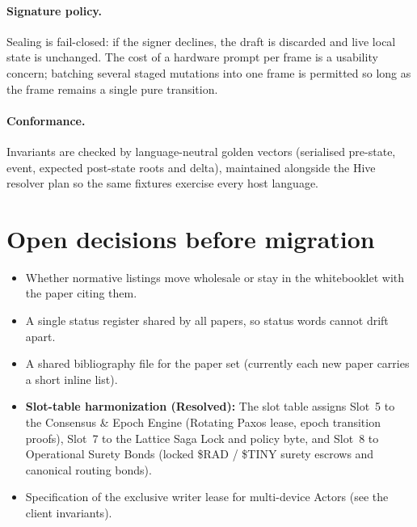 \documentclass[a4paper,11pt,twoside,parskip=half-,headings=small]{scrartcl}
\begin{document}
\paragraph{Signature policy.} Sealing is fail-closed: if the signer declines, the draft is discarded and live local state is unchanged. The cost of a hardware prompt per frame is a usability concern; batching several staged mutations into one frame is permitted so long as the frame remains a single pure transition.

\paragraph{Conformance.} Invariants are checked by language-neutral golden vectors (serialised pre-state, event, expected post-state roots and delta), maintained alongside the Hive resolver plan so the same fixtures exercise every host language.

\section{Open decisions before migration}
\begin{itemize}
  \item Whether normative listings move wholesale or stay in the whitebooklet with the paper citing them.
  \item A single status register shared by all papers, so status words cannot drift apart.
  \item A shared bibliography file for the paper set (currently each new paper carries a short inline list).
  \item \textbf{Slot-table harmonization (Resolved):} The slot table assigns Slot~5 to the Consensus \& Epoch Engine (Rotating Paxos lease, epoch transition proofs), Slot~7 to the Lattice Saga Lock and  policy byte, and Slot~8 to Operational Surety Bonds (locked \$RAD / \$TINY surety escrows and canonical routing bonds).
  \item Specification of the exclusive writer lease for multi-device Actors (see the client invariants).
\end{itemize}
\end{document}
